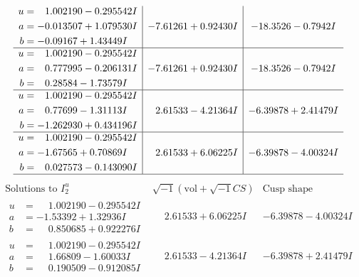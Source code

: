 \documentclass[1p]{elsarticle_modified}
\theoremstyle{definition}
\newcommand{\I}{\sqrt{-1}}
\begin{document}
$$\begin{array}{c|c|c}
\begin{aligned}
u &= \phantom{-}1.002190 - 0.295542 I \\
a &= -0.013507 + 1.079530 I \\
b &= -0.09167 + 1.43449 I\end{aligned}
 & -7.61261 + 0.92430 I & -18.3526 - 0.7942 I \\ \hline\begin{aligned}
u &= \phantom{-}1.002190 - 0.295542 I \\
a &= \phantom{-}0.777995 - 0.206131 I \\
b &= \phantom{-}0.28584 - 1.73579 I\end{aligned}
 & -7.61261 + 0.92430 I & -18.3526 - 0.7942 I \\ \hline\begin{aligned}
u &= \phantom{-}1.002190 - 0.295542 I \\
a &= \phantom{-}0.77699 - 1.31113 I \\
b &= -1.262930 + 0.434196 I\end{aligned}
 & \phantom{-}2.61533 - 4.21364 I & -6.39878 + 2.41479 I \\ \hline\begin{aligned}
u &= \phantom{-}1.002190 - 0.295542 I \\
a &= -1.67565 + 0.70869 I \\
b &= \phantom{-}0.027573 - 0.143090 I\end{aligned}
 & \phantom{-}2.61533 + 6.06225 I & -6.39878 - 4.00324 I\\
 \hline 
 \end{array}$$\newpage$$\begin{array}{c|c|c}  
\text{Solutions to }I^u_{2}& \I (\text{vol} + \sqrt{-1}CS) & \text{Cusp shape}\\
 \hline 
\begin{aligned}
u &= \phantom{-}1.002190 - 0.295542 I \\
a &= -1.53392 + 1.32936 I \\
b &= \phantom{-}0.850685 + 0.922276 I\end{aligned}
 & \phantom{-}2.61533 + 6.06225 I & -6.39878 - 4.00324 I \\ \hline\begin{aligned}
u &= \phantom{-}1.002190 - 0.295542 I \\
a &= \phantom{-}1.66809 - 1.60033 I \\
b &= \phantom{-}0.190509 - 0.912085 I\end{aligned}
 & \phantom{-}2.61533 - 4.21364 I & -6.39878 + 2.41479 I \\ \hline\begin{aligned}

\end{aligned}
\end{array}$$
\end{document}
